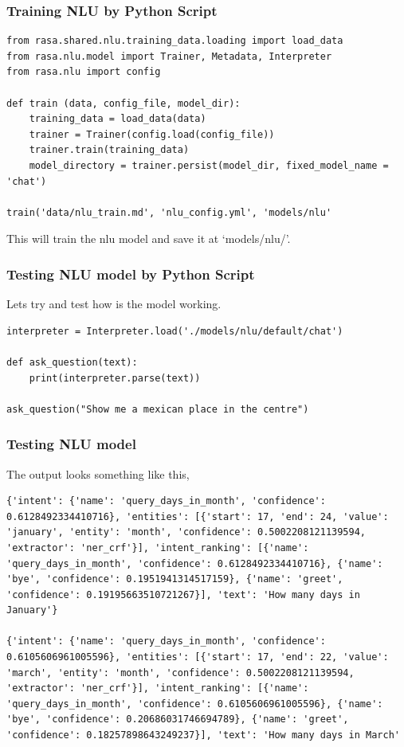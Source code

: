  \begin{frame}[fragile]\frametitle{Training NLU by Python Script}
 
\begin{lstlisting}
from rasa.shared.nlu.training_data.loading import load_data
from rasa.nlu.model import Trainer, Metadata, Interpreter
from rasa.nlu import config

def train (data, config_file, model_dir):
    training_data = load_data(data)
    trainer = Trainer(config.load(config_file))
    trainer.train(training_data)
    model_directory = trainer.persist(model_dir, fixed_model_name = 'chat')

train('data/nlu_train.md', 'nlu_config.yml', 'models/nlu'
\end{lstlisting}
This will train the nlu model and save it at `models/nlu/'.
\end{frame}

 \begin{frame}[fragile]\frametitle{Testing NLU model by Python Script}
 
Lets try and test how is the model working.

\begin{lstlisting}
interpreter = Interpreter.load('./models/nlu/default/chat')

def ask_question(text):
    print(interpreter.parse(text))

ask_question("Show me a mexican place in the centre")
\end{lstlisting}

\end{frame}

 \begin{frame}[fragile]\frametitle{Testing NLU model}
The output looks something like this,


\begin{lstlisting}
{'intent': {'name': 'query_days_in_month', 'confidence': 0.6128492334410716}, 'entities': [{'start': 17, 'end': 24, 'value': 'january', 'entity': 'month', 'confidence': 0.5002208121139594, 'extractor': 'ner_crf'}], 'intent_ranking': [{'name': 'query_days_in_month', 'confidence': 0.6128492334410716}, {'name': 'bye', 'confidence': 0.1951941314517159}, {'name': 'greet', 'confidence': 0.19195663510721267}], 'text': 'How many days in January'}

{'intent': {'name': 'query_days_in_month', 'confidence': 0.6105606961005596}, 'entities': [{'start': 17, 'end': 22, 'value': 'march', 'entity': 'month', 'confidence': 0.5002208121139594, 'extractor': 'ner_crf'}], 'intent_ranking': [{'name': 'query_days_in_month', 'confidence': 0.6105606961005596}, {'name': 'bye', 'confidence': 0.20686031746694789}, {'name': 'greet', 'confidence': 0.18257898643249237}], 'text': 'How many days in March'
\end{lstlisting}

\end{frame}

